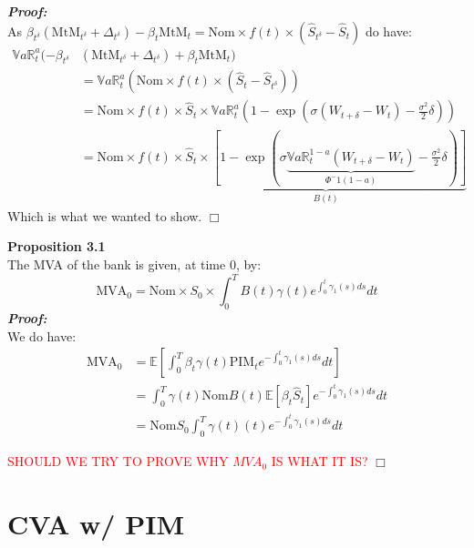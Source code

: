 \documentclass[11pt,a4paper]{article}
\newcommand{\red}[1]{\textcolor{red}{#1}}
\newcommand{\expect}[1]{\mathbb{E}\left[ #1 \right]}
\newcommand{\VaR}[2]{\mathbb{V}a\mathbb{R}^{#1}_{#2}}
\newcommand{\qed}{\hfill \ensuremath{\Box}}
\begin{document}
\noindent\textbf{\textit{Proof:}}\\
As $\beta_{t^\delta}\left( \text{MtM}_{t^\delta} + \Delta_{t^\delta} \right) - \beta_t \text{MtM}_t = \text{Nom} \times f(t) \times \left(\hat{S}_{t^\delta} - \hat{S}_t\right)$ do have:
\begin{align*}
    \VaR{a}{t}( -\beta_{t^\delta}&\left( \text{MtM}_{t^\delta} + \Delta_{t^\delta} \right) + \beta_t \text{MtM}_t) \\
    &=\VaR{a}{t}\left( \text{Nom} \times f(t) \times \left( \hat{S}_t - \hat{S}_{t^\delta} \right) \right)\\
    &=\text{Nom} \times f(t) \times \hat{S}_t \times \VaR{a}{t}\left( 1-\exp\left(\sigma(W_{t+\delta}-W_t)-\frac{\sigma^2}{2}\delta\right) \right)\\
    &=\text{Nom} \times f(t) \times \underbrace{\hat{S}_t \times \left[ 1-\exp\left(\sigma\underbrace{\VaR{1-a}{t}(W_{t+\delta}-W_t)}_{\Phi^-1(1-a)}-\frac{\sigma^2}{2}\delta\right) \right]}_{B(t)}
\end{align*}
Which is what we wanted to show.
\qed

\noindent\textbf{Proposition 3.1}\\
The MVA of the bank is given, at time 0, by:
\[
\text{MVA}_0 = \text{Nom} \times S_0 \times \int_0^T B(t)\gamma(t)e^{\int_0^t \gamma_1(s)ds} dt
\]
\textbf{\textit{Proof:}}\\
We do have:
\begin{align*}
\text{MVA}_0 &= \expect{\int_0^T \beta_t \gamma(t)\text{PIM}_te^{-\int_0^t \gamma_1(s)ds}dt}\\
&= \int_0^T \gamma(t) \text{Nom} B(t) \expect{ \beta_t \hat{S}_t }e^{-\int_0^t \gamma_1(s)ds}dt\\ 
&= \text{Nom} S_0 \int_0^T \gamma(t) (t) e^{-\int_0^t \gamma_1(s)ds}dt
\end{align*}

\red{SHOULD WE TRY TO PROVE WHY $MVA_0$ IS WHAT IT IS?}
\qed


\section{CVA w/ PIM}\label{sec:CVA}
\end{document}
